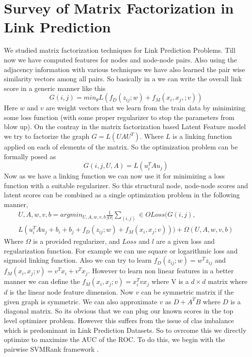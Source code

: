 \section*{Survey of Matrix Factorization in Link Prediction}
We studied matrix factorization techniques for Link Prediction Problems. Till now we have computed features for nodes and node-node pairs. Also using the adjacency information with various techniques we have also learned the pair wise similarity vectors among all pairs. So basically in a we can write the overall link score in a generic manner like this
\begin{equation}
	G(i,j) = min_{\theta} L (f_{D}(z_{ij};w) + f_{M}(x_i,x_j,;v))
\end{equation}
Here $w$ and $v$ are weight vectors that we learn from the train data by minimizing some loss function (with some proper regularizer to stop the parameters from blow up).  On the contray in the matrix factorization based Latent Feature model we try to factorize the graph $G = L ( U A U^{T})$. Where $L$ is a linking function applied on each of elements of the matrix. So the optimization problem can be formally posed as
\begin{equation}
	G(i,j,U,A) =  L (u_{i}^{T} A u_{j})
\end{equation}
Now as we have a linking function we can now use it for minimizing a loss function with a suitable regularizer. So this structural node, node-node scores and latent scores can be combined as a single optimization problem in the following manner,
\begin{multline}
	U,A,w,v,b = argmin_{U,A,w,v,b} \frac{1}{|O|}  \sum_{(i,j)}\in O  Loss( G(i,j), \\
	 L(u_i^T A u_j + b_i + b_j + f_D(z_{ij};w) + f_M(x_i,x_j;v))) + \Omega(U,A,w,v,b)
\end{multline}
Where $\Omega$ is a provided regularizer, and $Loss$ and $l$ are a given loss and regularization function. For example we can use square or logarithmic loss and sigmoid linking function. Also we can try to learn $f_D(z_{ij};w) = w^T z_{ij}$ and $f_M(x_i,x_j;v) = v^T x_i + v^T x_j$. However to learn non linear features in a better manner we can define the  $f_M(x_i,x_j;v) =  x_i^T v x_j$ where  V is a $d \times d$ matrix where $d$ is the linear node feature dimension. Now $v$ can be symmetric matrix if the given graph is symmetric. We can also approximate $v$ as $D + A^TB$ where $D$ is a diagonal matrix. So its obvious that we can plug our known scores in the top level optimizer problem. However this suffers from the issue of clas imbalance which is predominant in Link Prediction Datasets. So to ovrcome this we directly optimize to maximize the AUC of the ROC.  To do this, we begin with the pairwise SVMRank framework .

